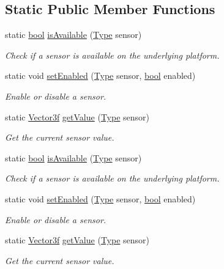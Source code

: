 \subsection*{Static Public Member Functions}
\begin{DoxyCompactItemize}
\item 
static \hyperlink{term__entry_8h_a002004ba5d663f149f6c38064926abac}{bool} \hyperlink{classsf_1_1_sensor_a7b7a2570218221781233bd495323abf0}{is\-Available} (\hyperlink{classsf_1_1_sensor_a687375af3ab77b818fca73735bcaea84}{Type} sensor)
\begin{DoxyCompactList}\small\item\em Check if a sensor is available on the underlying platform. \end{DoxyCompactList}\item 
static void \hyperlink{classsf_1_1_sensor_afb31c5697d2e0a5fec70d702ec1d6cd9}{set\-Enabled} (\hyperlink{classsf_1_1_sensor_a687375af3ab77b818fca73735bcaea84}{Type} sensor, \hyperlink{term__entry_8h_a002004ba5d663f149f6c38064926abac}{bool} enabled)
\begin{DoxyCompactList}\small\item\em Enable or disable a sensor. \end{DoxyCompactList}\item 
static \hyperlink{namespacesf_a36e44d9e6d8f649703698ec9d24ac052}{Vector3f} \hyperlink{classsf_1_1_sensor_ab9a2710f55ead2f7b4e1b0bead34457e}{get\-Value} (\hyperlink{classsf_1_1_sensor_a687375af3ab77b818fca73735bcaea84}{Type} sensor)
\begin{DoxyCompactList}\small\item\em Get the current sensor value. \end{DoxyCompactList}\item 
static \hyperlink{term__entry_8h_a002004ba5d663f149f6c38064926abac}{bool} \hyperlink{classsf_1_1_sensor_a7b7a2570218221781233bd495323abf0}{is\-Available} (\hyperlink{classsf_1_1_sensor_a687375af3ab77b818fca73735bcaea84}{Type} sensor)
\begin{DoxyCompactList}\small\item\em Check if a sensor is available on the underlying platform. \end{DoxyCompactList}\item 
static void \hyperlink{classsf_1_1_sensor_afb31c5697d2e0a5fec70d702ec1d6cd9}{set\-Enabled} (\hyperlink{classsf_1_1_sensor_a687375af3ab77b818fca73735bcaea84}{Type} sensor, \hyperlink{term__entry_8h_a002004ba5d663f149f6c38064926abac}{bool} enabled)
\begin{DoxyCompactList}\small\item\em Enable or disable a sensor. \end{DoxyCompactList}\item 
static \hyperlink{namespacesf_a36e44d9e6d8f649703698ec9d24ac052}{Vector3f} \hyperlink{classsf_1_1_sensor_ab9a2710f55ead2f7b4e1b0bead34457e}{get\-Value} (\hyperlink{classsf_1_1_sensor_a687375af3ab77b818fca73735bcaea84}{Type} sensor)
\begin{DoxyCompactList}\small\item\em Get the current sensor value. \end{DoxyCompactList}\end{DoxyCompactItemize}


